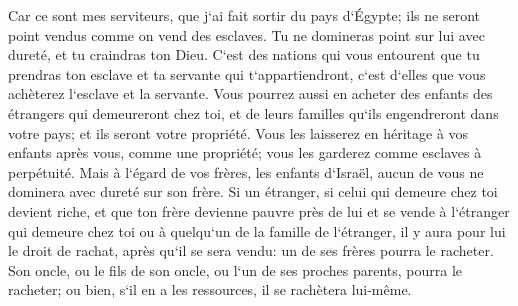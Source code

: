 \verse Car ce sont mes serviteurs, que j`ai fait sortir du pays d`Égypte; ils ne seront point vendus comme on vend des esclaves. 
\verse Tu ne domineras point sur lui avec dureté, et tu craindras ton Dieu. 
\verse C`est des nations qui vous entourent que tu prendras ton esclave et ta servante qui t`appartiendront, c`est d`elles que vous achèterez l`esclave et la servante. 
\verse Vous pourrez aussi en acheter des enfants des étrangers qui demeureront chez toi, et de leurs familles qu`ils engendreront dans votre pays; et ils seront votre propriété. 
\verse Vous les laisserez en héritage à vos enfants après vous, comme une propriété; vous les garderez comme esclaves à perpétuité. Mais à l`égard de vos frères, les enfants d`Israël, aucun de vous ne dominera avec dureté sur son frère. 
\verse Si un étranger, si celui qui demeure chez toi devient riche, et que ton frère devienne pauvre près de lui et se vende à l`étranger qui demeure chez toi ou à quelqu`un de la famille de l`étranger, 
\verse il y aura pour lui le droit de rachat, après qu`il se sera vendu: un de ses frères pourra le racheter. 
\verse Son oncle, ou le fils de son oncle, ou l`un de ses proches parents, pourra le racheter; ou bien, s`il en a les ressources, il se rachètera lui-même. 
